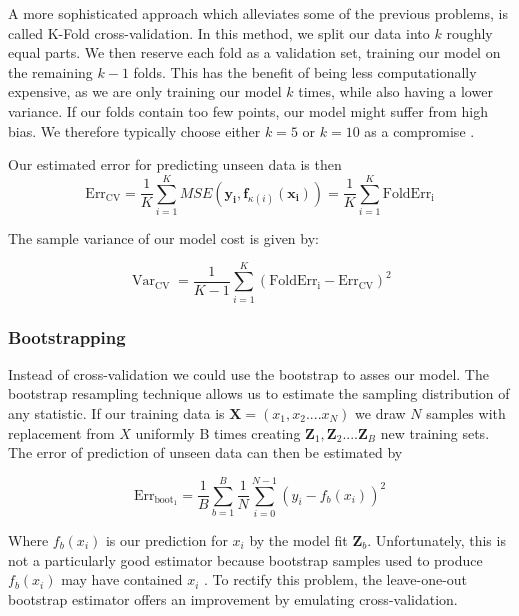 \documentclass{article}
\DeclareMathOperator*{\Var}{Var}
\begin{document}
A more sophisticated approach which alleviates some of the previous problems, is called K-Fold cross-validation. In this method, we split our data into $k$ roughly equal parts. We then reserve each fold as a validation set, training our model on the remaining $k-1$ folds. This has the benefit of being less computationally expensive, as we are only training our model $k$ times, while also having a lower variance. If our folds contain too few points, our model might suffer from high bias. We therefore typically choose either $k = 5$ or $k = 10$ as a compromise \cite[p.~243]{Hastie2009}.

Our estimated error for predicting unseen data is then
\begin{equation*}
    \text{Err}_{\text{CV}}= \frac{1}{K} \sum_{i=1}^{K}
    MSE(\boldsymbol{y_i},\boldsymbol{f}_{\kappa(i)}(\boldsymbol{x_i})) = \frac{1}{K} \sum_{i=1}^{K} \text{FoldErr}_{\text{i}}
\end{equation*}

The sample variance of our model cost is given by:

\begin{equation*} \Var_{\text{CV}} = \frac{1}{K - 1} \sum_{i=1}^{K}( \text{FoldErr}_{\text{i}} - \text{Err}_{\text{CV}})^2
\end{equation*}



\subsubsection{Bootstrapping}
Instead of cross-validation we could use the bootstrap to asses our model. The bootstrap resampling technique allows us to estimate the sampling distribution of any statistic. If our training data is $\textbf{X} = (x_1, x_2 .... x_N)$ we draw $N$ samples with replacement from $X$ uniformly B times creating $\boldsymbol{Z}_1, \boldsymbol{Z}_2 .... \boldsymbol{Z}_B$ new training sets. The error of prediction of unseen data can then be estimated by 

\begin{equation*}
    \text{Err}_{\text{boot}_1} =  \frac{1}{B} \sum_{b=1}^B \frac{1}{N} \sum_{i = 0}^{N-1} (y_i - f_b(x_i))^2
\end{equation*}

Where $f_b(x_i)$ is our prediction for $x_i$ by the model fit $\boldsymbol{Z}_b$. Unfortunately, this is not a particularly good estimator because bootstrap samples used to produce $f_b(x_i)$ may have contained $x_i$ \cite[p.~270]{Hastie2009}. To rectify this problem, the leave-one-out bootstrap estimator offers an improvement by emulating cross-validation.
\end{document}
